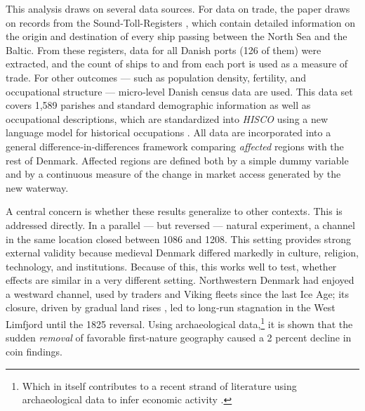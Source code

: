 \documentclass[12pt]{article}
\begin{document}
This analysis draws on several data sources. For data on trade, the paper draws on records from the Sound-Toll-Registers \citep{soundtoll_data}, which contain detailed information on the origin and destination of every ship passing between the North Sea and the Baltic. From these registers, data for all Danish ports (126 of them) were extracted, and the count of ships to and from each port is used as a measure of trade. For other outcomes — such as population density, fertility, and occupational structure — micro‑level Danish census data \citep{mathiesen2022linklives} are used. This data set covers 1,589 parishes and standard demographic information as well as occupational descriptions, which are standardized into \textit{HISCO} \citep{leeuwen2002hisco} using a new language model for historical occupations \citep{dahl2024breaking}. All data are incorporated into a general difference‑in‑differences framework comparing \textit{affected} regions with the rest of Denmark. Affected regions are defined both by a simple dummy variable and by a continuous measure of the change in market access generated by the new waterway.

A central concern is whether these results generalize to other contexts. This is addressed directly. In a parallel — but reversed — natural experiment, a channel in the same location closed between 1086 and 1208. This setting provides strong external validity because medieval Denmark differed markedly in culture, religion, technology, and institutions. Because of this, this works well to test, whether effects are similar in a very different setting. Northwestern Denmark had enjoyed a westward channel, used by traders and Viking fleets since the last Ice Age; its closure, driven by gradual land rises \citep{Christensen2004}, led to long‑run stagnation in the West Limfjord until the 1825 reversal. Using archaeological data,\footnote{Which in itself contributes to a recent strand of literature using archaeological data to infer economic activity \citep{Barjamovic2019, Bakker2021Phonecians, Allen2023, boehm2024}.} it is shown that the sudden \textit{removal} of favorable first‑nature geography caused a 2 percent decline in coin findings.
\end{document}
